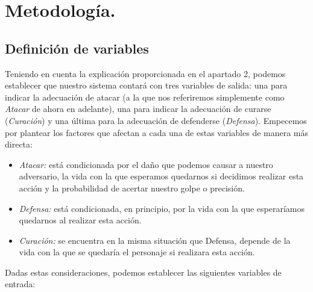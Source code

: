\section{Metodología.}
\subsection{Definición de variables}
Teniendo en cuenta la explicación proporcionada en el apartado 2, podemos establecer que nuestro sistema contará con tres variables de salida: una para indicar la adecuación de atacar (a la que nos referiremos simplemente como \textit{Atacar} de ahora en adelante), una para indicar la adecuación de curarse (\textit{Curación}) y una última para la adecuación de defenderse (\textit{Defensa}).
Empecemos por plantear los factores que afectan a cada una de estas variables de manera más directa:
\begin{itemize}
	\item \textit{Atacar:} está condicionada por el daño que podemos causar a nuestro adversario, la vida con la que esperamos quedarnos si decidimos realizar esta acción y la probabilidad de acertar nuestro golpe o precisión.
	\item \textit{Defensa:} está condicionada, en principio, por la vida con la que esperaríamos quedarnos al realizar esta acción.
	\item \textit{Curación:} se encuentra en la misma situación que Defensa, depende de la vida con la que se quedaría el personaje si realizara esta acción.
\end{itemize}

Dadas estas consideraciones, podemos establecer las siguientes variables de entrada:

